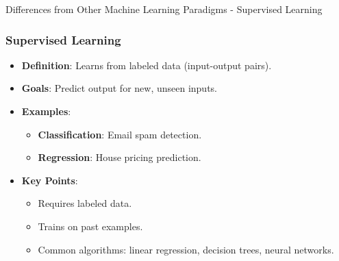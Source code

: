 \documentclass[aspectratio=169]{beamer}
\begin{document}
\begin{frame}[fragile]{Differences from Other Machine Learning Paradigms - Supervised Learning}
    \frametitle{Supervised Learning}
    \begin{itemize}
        \item \textbf{Definition}: Learns from labeled data (input-output pairs).
        \item \textbf{Goals}: Predict output for new, unseen inputs.
        \item \textbf{Examples}:
            \begin{itemize}
                \item \textbf{Classification}: Email spam detection.
                \item \textbf{Regression}: House pricing prediction.
            \end{itemize}
        \item \textbf{Key Points}:
            \begin{itemize}
                \item Requires labeled data.
                \item Trains on past examples.
                \item Common algorithms: linear regression, decision trees, neural networks.
            \end{itemize}
    \end{itemize}
\end{frame}
\end{document}
